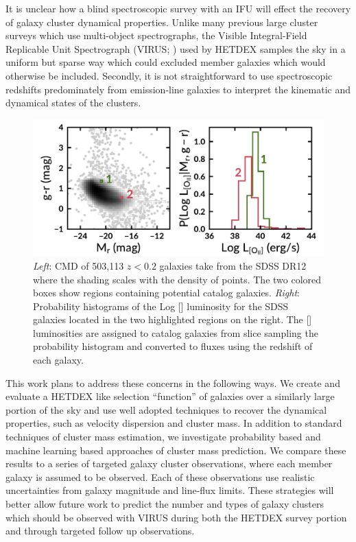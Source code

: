 \documentclass[fleqn,usenatbib]{mnras}
\begin{document}
It is unclear how a blind spectroscopic survey with an IFU will effect the recovery of galaxy cluster dynamical properties. Unlike many previous large cluster surveys  which use multi-object spectrographs, the Visible Integral-Field Replicable Unit Spectrograph (VIRUS; \citealt{Hill2012}) used by HETDEX samples the sky in a uniform but sparse way which could excluded member galaxies which would otherwise be included. Secondly, it is not straightforward to use spectroscopic redshifts predominately from emission-line galaxies to interpret the kinematic and dynamical states of the clusters.

\begin{figure}
	\includegraphics[width=\textwidth]{figures/oii_sdss.pdf} 
	\caption[Illustration of the probability based \hbox{[]} flux prediction method.]{\textit{Left}: CMD of 503,113 $z<0.2$ galaxies take from the SDSS DR12 where the shading scales with the density of points. The two colored boxes show regions containing potential catalog galaxies. \textit{Right}: Probability histograms of the Log \hbox{[]} luminosity for the SDSS galaxies located in the two highlighted regions on the right. The \hbox{[]} luminosities are assigned to catalog galaxies from slice sampling the probability histogram and converted to fluxes using the redshift of each galaxy.}
	\label{fig: oii sdss} 
\end{figure}

This work plans to address these concerns in the following ways. We create and evaluate a HETDEX like selection ``function'' of galaxies over a similarly large portion of the sky and use well adopted techniques to recover the dynamical properties, such as velocity dispersion and cluster mass. In addition to standard techniques of cluster mass estimation, we investigate probability based and machine learning based approaches of cluster mass prediction. We compare these results to a series of targeted galaxy cluster observations, where each member galaxy is assumed to be observed. Each of these observations use realistic uncertainties from galaxy magnitude and line-flux limits. These strategies will better allow future work to predict the number and types of galaxy clusters which should be observed with VIRUS during both the HETDEX survey portion and through targeted follow up observations.
\end{document}
